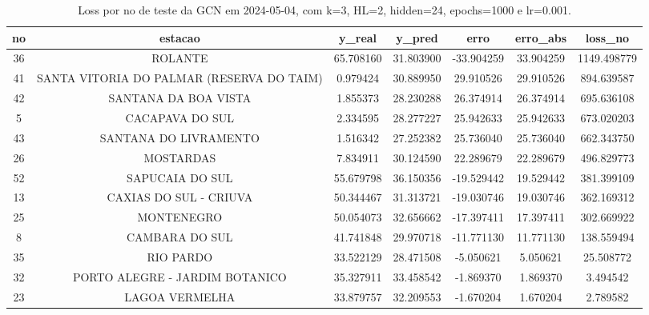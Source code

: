 \begin{table}[h]
\centering
\caption{Loss por no de teste da GCN em 2024-05-04, com k=3, HL=2, hidden=24, epochs=1000 e lr=0.001.}
\label{tab:gcn_loss_k3_hl2_h24_e1000_d20240504}
\begin{tabular}{ccccccc}
\toprule
no & estacao & y\_real & y\_pred & erro & erro\_abs & loss\_no \\
\midrule
36 & ROLANTE & 65.708160 & 31.803900 & -33.904259 & 33.904259 & 1149.498779 \\
41 & SANTA VITORIA DO PALMAR (RESERVA DO TAIM) & 0.979424 & 30.889950 & 29.910526 & 29.910526 & 894.639587 \\
42 & SANTANA DA BOA VISTA & 1.855373 & 28.230288 & 26.374914 & 26.374914 & 695.636108 \\
5 & CACAPAVA DO SUL & 2.334595 & 28.277227 & 25.942633 & 25.942633 & 673.020203 \\
43 & SANTANA DO LIVRAMENTO & 1.516342 & 27.252382 & 25.736040 & 25.736040 & 662.343750 \\
26 & MOSTARDAS & 7.834911 & 30.124590 & 22.289679 & 22.289679 & 496.829773 \\
52 & SAPUCAIA DO SUL & 55.679798 & 36.150356 & -19.529442 & 19.529442 & 381.399109 \\
13 & CAXIAS DO SUL - CRIUVA & 50.344467 & 31.313721 & -19.030746 & 19.030746 & 362.169312 \\
25 & MONTENEGRO & 50.054073 & 32.656662 & -17.397411 & 17.397411 & 302.669922 \\
8 & CAMBARA DO SUL & 41.741848 & 29.970718 & -11.771130 & 11.771130 & 138.559494 \\
35 & RIO PARDO & 33.522129 & 28.471508 & -5.050621 & 5.050621 & 25.508772 \\
32 & PORTO ALEGRE - JARDIM BOTANICO & 35.327911 & 33.458542 & -1.869370 & 1.869370 & 3.494542 \\
23 & LAGOA VERMELHA & 33.879757 & 32.209553 & -1.670204 & 1.670204 & 2.789582 \\
\bottomrule
\end{tabular}
\end{table}
